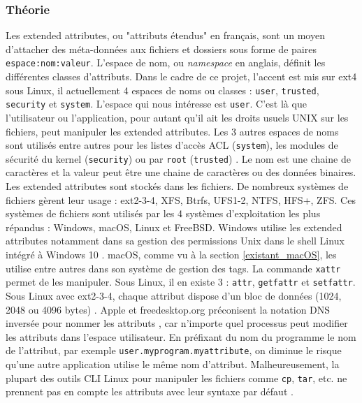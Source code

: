 \documentclass[a4paper, 12pt]{article}
\begin{document}
\subsubsection{Théorie}
Les extended attributes, ou "attributs étendus" en français, sont un moyen d'attacher des 
méta-données aux fichiers et dossiers sous forme de paires \texttt{espace:nom:valeur}. 
L'espace de nom, ou \textit{namespace} en anglais, définit les différentes classes d'attributs. 
Dans le cadre de ce projet, l'accent est mis sur ext4 sous Linux, il actuellement 4 espaces de noms 
ou classes : \texttt{user}, \texttt{trusted}, \texttt{security} et 
\texttt{system}. L'espace qui nous intéresse est \texttt{user}. C'est là que 
l'utilisateur ou l'application, pour autant qu'il ait les droits usuels UNIX sur les fichiers, peut 
manipuler les extended attributes. Les 3 autres espaces de noms sont utilisés entre autres pour 
les listes d'accès ACL (\texttt{system}), les modules de sécurité du kernel 
(\texttt{security}) ou par \texttt{root} (\texttt{trusted})
\cite{ref11} \cite{ref12}.
Le nom est une chaine de caractères et la valeur peut être une chaine de caractères ou des données binaires. 
Les extended attributes sont stockés dans les fichiers. De nombreux systèmes de fichiers gèrent leur 
usage : ext2-3-4, XFS, Btrfs, UFS1-2, NTFS, HFS+, ZFS. Ces systèmes de fichiers sont utilisés par 
les 4 systèmes d'exploitation les plus répandus : Windows, macOS, Linux et FreeBSD. Windows utilise 
les extended attributes notamment dans sa gestion des permissions Unix dans le shell Linux intégré 
à Windows 10 \cite{ref21}. macOS, comme vu à la section \ref{existant_macOS}, les utilise entre 
autres dans son système de gestion des tags. La commande \texttt{xattr} permet de les 
manipuler. Sous Linux, il en existe 3 : \texttt{attr}, \texttt{getfattr} et 
\texttt{setfattr}. Sous Linux avec ext2-3-4, chaque attribut dispose d'un bloc de données 
(1024, 2048 ou 4096 bytes) \cite{ref12}.
Apple et freedesktop.org préconisent la notation DNS inversée pour 
nommer les attributs \cite{ref8}, \cite{ref24} car n'importe quel processus peut modifier les 
attributs dans l'espace utilisateur. En préfixant du nom du programme le nom de l'attribut, par 
exemple \texttt{user.myprogram.myattribute}, on diminue le risque qu'une autre 
application utilise le même nom d'attribut. Malheureusement, la plupart des outils CLI Linux 
pour manipuler les fichiers comme \texttt{cp}, \texttt{tar}, etc. ne prennent 
pas en compte les attributs avec leur syntaxe par défaut \cite{ref4}.
\end{document}
